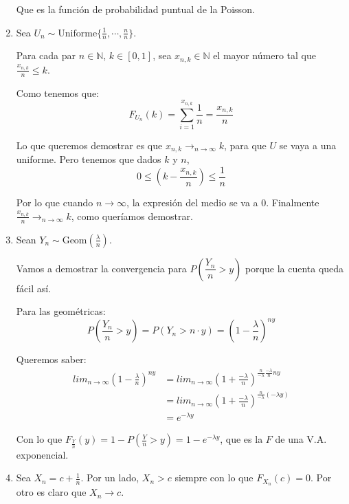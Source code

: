 \begin{enumerate}
		Que es la función de probabilidad puntual de la Poisson.
		
	\item
		Sea $U_n \sim \text{Uniforme}\{\frac{1}{n}, \cdots, \frac{n}{n}\}$.
		
		Para cada par $n\in\mathbb{N}$, $k\in [0, 1]$,
		sea $x_{n,k} \in \mathbb{N}$ el mayor número
		tal que $\frac{x_{n,k}}{n} \leq k$.
		
		Como tenemos que: $$F_{U_n}(k) = \sum_{i=1}^{x_{n,k}} \frac{1}{n} = \frac{x_{n,k}}{n}$$
		
		Lo que queremos demostrar es que $x_{n,k}\rightarrow_{n\rightarrow\infty}k$, para que $U$ se vaya a una uniforme. Pero tenemos que dados $k$ y $n$,
		$$0 \leq \left( k - \frac{x_{n,k}}{n}\right) \leq \frac{1}{n}$$
		
		Por lo que cuando $n\rightarrow\infty$, la expresión del medio se va a $0$. Finalmente $\frac{x_{n,k}}{n}\rightarrow_{n\rightarrow\infty}k$, como queríamos demostrar.
		
	\item
		Sean $Y_n \sim \text{Geom}(\frac{\lambda}{n})$.
		
		Vamos a demostrar la convergencia para $P\left(\dfrac{Y_n}{n} > y\right)$ porque la cuenta queda fácil así.
		
		Para las geométricas:
		$$P\left(\dfrac{Y_n}{n} > y\right) = P(Y_n > n\cdot y) = \left(1 - \frac{\lambda}{n}\right)^{ny}$$
		
		Queremos saber:
		\begin{align*}
			lim_{n\rightarrow\infty} \left(1 - \frac{\lambda}{n}\right)^{ny} & = lim_{n\rightarrow\infty} \left(1 + \frac{-\lambda}{n}\right)^{\frac{n}{-\lambda} \frac{-\lambda}{n} ny} \\
			                                                                 & = lim_{n\rightarrow\infty} \left(1 + \frac{-\lambda}{n}\right)^{\frac{n}{-\lambda} (-\lambda y)}          \\
			                                                                 & = e^{-\lambda y}
		\end{align*}
		
		Con lo que $F_{\frac{Y}{n}}(y) = 1 - P\left(\frac{Y}{n} > y\right) = 1 - e^{-\lambda y}$, que es la $F$ de una V.A. exponencial.
		
	\item
		Sea $X_n = c + \frac{1}{n}$. Por un lado, $X_n > c$ siempre con lo que $F_{X_n}(c) = 0$. Por otro es claro que $X_n \rightarrow c$.
\end{enumerate}
